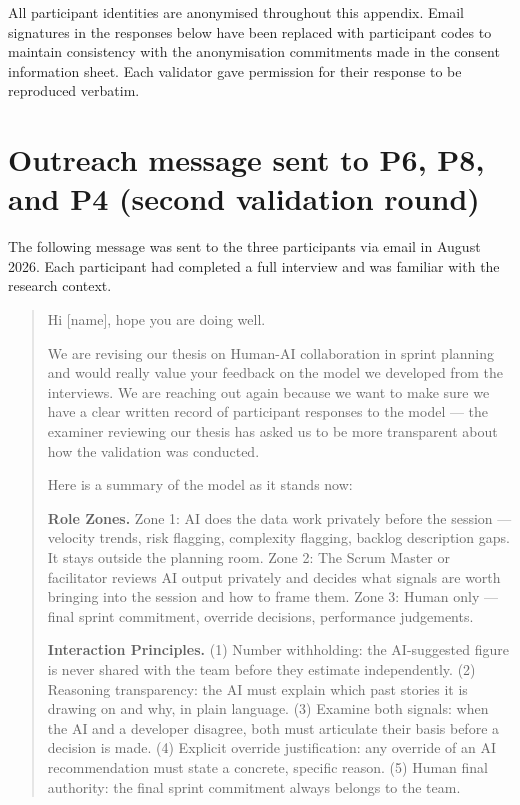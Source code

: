 \documentclass[a4paper,twoside]{bth}
\begin{document}
All participant identities are anonymised throughout this appendix. Email signatures in the responses below have been replaced with participant codes to maintain consistency with the anonymisation commitments made in the consent information sheet. Each validator gave permission for their response to be reproduced verbatim.

\section*{Outreach message sent to P6, P8, and P4 (second validation round)}

The following message was sent to the three participants via email in August 2026. Each participant had completed a full interview and was familiar with the research context.

\begin{quote}
Hi [name], hope you are doing well.

We are revising our thesis on Human-AI collaboration in sprint planning and would really value your feedback on the model we developed from the interviews. We are reaching out again because we want to make sure we have a clear written record of participant responses to the model --- the examiner reviewing our thesis has asked us to be more transparent about how the validation was conducted.

Here is a summary of the model as it stands now:

\textbf{Role Zones.} Zone 1: AI does the data work privately before the session --- velocity trends, risk flagging, complexity flagging, backlog description gaps. It stays outside the planning room. Zone 2: The Scrum Master or facilitator reviews AI output privately and decides what signals are worth bringing into the session and how to frame them. Zone 3: Human only --- final sprint commitment, override decisions, performance judgements.

\textbf{Interaction Principles.} (1) Number withholding: the AI-suggested figure is never shared with the team before they estimate independently. (2) Reasoning transparency: the AI must explain which past stories it is drawing on and why, in plain language. (3) Examine both signals: when the AI and a developer disagree, both must articulate their basis before a decision is made. (4) Explicit override justification: any override of an AI recommendation must state a concrete, specific reason. (5) Human final authority: the final sprint commitment always belongs to the team.


\end{quote}
\end{document}
